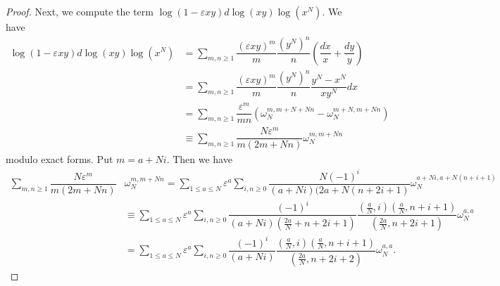 \documentclass[11pt,a4,leqno]{amsart}
\theoremstyle{my theoremstyle}
\theoremstyle{dfn}
\theoremstyle{remark}
\renewcommand{\1}{\mathbbm{1}}
\newcommand{\e}{\varepsilon}
\numberwithin{equation}{section}
\begin{document}
\begin{proof}
Next, we compute the term $\log(1- \e xy) d\log (xy) \log(x^N)$. 
We have 
\begin{align*}
\log(1- \e xy) d\log (xy) \log(x^N) 
&=\sum_{m, n \ge 1} \dfrac{(\e xy)^m}{m} \dfrac{(y^N)^n}{n} \left(\dfrac{dx}x + \dfrac{dy}y \right) \\
&=\sum_{m, n \ge 1} \dfrac{(\e xy)^m}{m} \dfrac{(y^N)^n}{n} \dfrac{y^N-x^N}{xy^N}dx \\
&=\sum_{m, n \ge 1} \dfrac{\e^m}{mn} (\omega_N^{m, m+N+Nn} -\omega_N^{m+N, m+Nn}) \\
& \equiv \sum_{m, n \ge 1} \dfrac{N\e^m}{m (2m+Nn)} \omega_N^{m, m+Nn} 
\end{align*}
modulo exact forms.
Put $m=a+Ni$. Then we have 
\begin{align*}
\sum_{m, n \ge 1} \dfrac{N\e^m}{m (2m+Nn)} & \omega_N^{m, m+Nn} =\sum_{1 \leq a \leq N} \e^a \sum_{i, n \ge 0} \dfrac{N(-1)^i}{(a+Ni) (2a+N(n+2i+1)} \omega_N^{a+Ni, a+N(n+i+1)} \\
& \equiv \sum_{1 \leq a \leq N} \e^a \sum_{i, n \ge 0} \dfrac{(-1)^i}{(a+Ni) \left(\frac{2a}{N}+n+2i+1\right) } \dfrac{\left(\frac{a}N, i \right)\left(\frac{a}N, n+i+1 \right)}{\left(\frac{2a}N, n+2i+1 \right)}
\omega_N^{a, a} \\
&= \sum_{1 \leq a \leq N} \e^a \sum_{i, n \ge 0} \dfrac{(-1)^i}{(a+Ni)} \dfrac{\left(\frac{a}N, i \right)\left(\frac{a}N, n+i+1 \right)}{\left(\frac{2a}N, n+2i+2 \right)}
\omega_N^{a, a}. 
\end{align*}


\end{proof}
\end{document}
